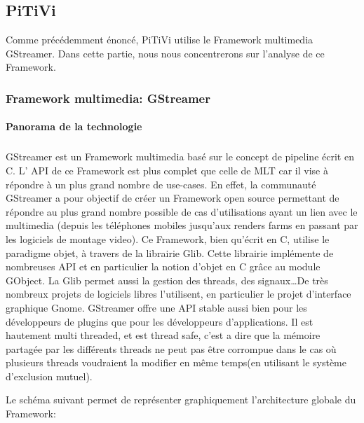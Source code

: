 \subsection {PiTiVi}

Comme précédemment énoncé, PiTiVi utilise le Framework multimedia
GStreamer. Dans cette partie, nous nous concentrerons sur l'analyse de
ce Framework.

\subsubsection {Framework multimedia: GStreamer}

\paragraph {Panorama de la technologie}

\subparagraph{}

GStreamer est un Framework multimedia basé sur le concept de pipeline
écrit en C. L' API de ce Framework est plus complet que celle de
MLT car il vise à répondre à un plus grand nombre
de use-cases.  En effet, la communauté GStreamer a pour objectif de
créer un Framework open source permettant de répondre au plus grand
nombre possible de cas d'utilisations ayant un lien avec le multimedia
(depuis les téléphones mobiles jusqu'aux renders farms en passant
par les logiciels de montage video). Ce Framework, bien qu'écrit en
C, utilise le paradigme objet, à travers de la librairie Glib. Cette
librairie implémente de nombreuses API et en particulier la notion
d'objet en C grâce au module GObject. La Glib permet aussi la gestion
des threads, des signaux\ldots De très nombreux projets de logiciels
libres l'utilisent, en particulier le projet d'interface graphique
Gnome. GStreamer offre une API stable aussi bien pour les développeurs
de plugins que pour les développeurs d'applications. Il est hautement
multi threaded, et est thread safe,
c'est a dire que la mémoire partagée par les différents threads ne
peut pas être corrompue dans le cas où plusieurs threads voudraient
la modifier en même temps(en utilisant le système d'exclusion mutuel).

Le schéma suivant permet de représenter graphiquement l'architecture
globale du Framework:

